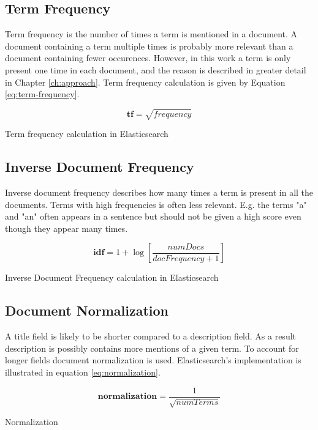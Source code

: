 \subsection{Term Frequency}
Term frequency is the number of times a term is mentioned in a document.
A document containing a term multiple times is probably more relevant than a document containing fewer occurences.
However, in this work a term is only present one time in each document, and the reason is described in greater detail in Chapter \ref{ch:approach}.
Term frequency calculation is given by Equation \ref{eq:term-frequency}.

\begin{cequation}[H]
	\begin{equation}
		\mathbf{tf} = \sqrt{frequency}
	\end{equation}
	\caption{Term frequency calculation in Elasticsearch}
  \label{eq:term-frequency}
\end{cequation}

\subsection{Inverse Document Frequency}
Inverse document frequency describes how many times a term is present in all the documents.
Terms with high frequencies is often less relevant.
E.g. the terms "a" and "an" often appears in a sentence but should not be given a high score even though they appear many times.

\begin{cequation}[H]
	\begin{equation}
		\mathbf{idf} = 1 + \log{[\frac{numDocs}{docFrequency + 1}]}
	\end{equation}
	\caption{Inverse Document Frequency calculation in Elasticsearch}
  \label{eq:idf}
\end{cequation}

\subsection{Document Normalization}
A title field is likely to be shorter compared to a description field.
As a result description is possibly contains more mentions of a given term.
To account for longer fields document normalization is used.
Elasticsearch's implementation is illustrated in equation \ref{eq:normalization}.

\begin{cequation}[H]
	\begin{equation}
		\mathbf{normalization} = \frac{1}{\sqrt{numTerms}}
	\end{equation}
	\caption{Normalization}
  \label{eq:normalization}
\end{cequation}

